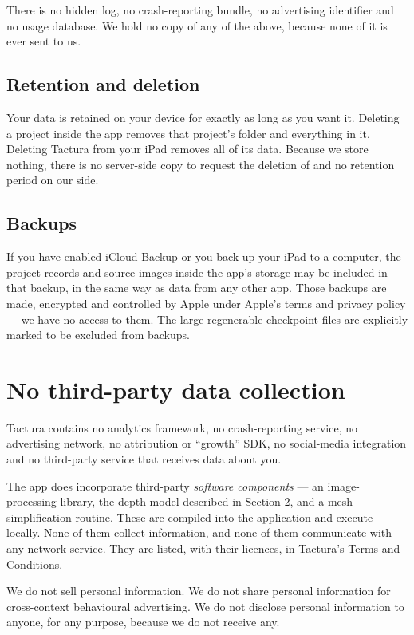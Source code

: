 \documentclass[11pt]{article}
\begin{document}
There is no hidden log, no crash-reporting bundle, no advertising identifier and no
usage database. We hold no copy of any of the above, because none of it is ever sent
to us.

\subsection{Retention and deletion}
Your data is retained on your device for exactly as long as you want it. Deleting a
project inside the app removes that project's folder and everything in it. Deleting
Tactura from your iPad removes all of its data. Because we store nothing, there is no
server-side copy to request the deletion of and no retention period on our side.

\subsection{Backups}
If you have enabled iCloud Backup or you back up your iPad to a computer, the project
records and source images inside the app's storage may be included in that backup, in
the same way as data from any other app. Those backups are made, encrypted and
controlled by Apple under Apple's terms and privacy policy — we have no access to
them. The large regenerable checkpoint files are explicitly marked to be excluded from
backups.

\section{No third-party data collection}

Tactura contains no analytics framework, no crash-reporting service, no advertising
network, no attribution or “growth” SDK, no social-media integration and no
third-party service that receives data about you.

The app does incorporate third-party \emph{software components} — an image-processing
library, the depth model described in Section 2, and a mesh-simplification routine.
These are compiled into the application and execute locally. None of them collect
information, and none of them communicate with any network service. They are listed,
with their licences, in Tactura's Terms and Conditions.

We do not sell personal information. We do not share personal information for
cross-context behavioural advertising. We do not disclose personal information to
anyone, for any purpose, because we do not receive any.
\end{document}

